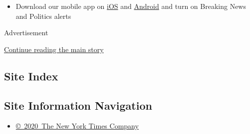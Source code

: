\begin{itemize}
  \begin{itemize}
  \tightlist
  \item
    Download our mobile app on
    \href{https://apps.apple.com/us/app/nytimes/id284862083?ls=1\&mat_click_id=5c79ae7455014fd1bd66b5610c05b8f2-20191112-16948\&referrer=mat_click_id\%3D5c79ae7455014fd1bd66b5610c05b8f2-20191112-16948\%26link_click_id\%3D722930677036718082}{iOS}
    and
    \href{http://a.localytics.com/android?id=com.nytimes.android\&referrer=utm_source\%3Dother_nyt_mobile_web\%26utm_medium\%3DWeb\%2520page\%26utm_term\%3DGeneral\%2520Mobile\%2520Page\%26utm_campaign\%3DNYT\%2520Mobile\%2520General\%2520Page}{Android}
    and turn on Breaking News and Politics alerts
  \end{itemize}
\end{itemize}

Advertisement

\protect\hyperlink{after-bottom}{Continue reading the main story}

\hypertarget{site-index}{%
\subsection{Site Index}\label{site-index}}

\hypertarget{site-information-navigation}{%
\subsection{Site Information
Navigation}\label{site-information-navigation}}

\begin{itemize}
\tightlist
\item
  \href{https://help.nytimes.com/hc/en-us/articles/115014792127-Copyright-notice}{©~2020~The
  New York Times Company}
\end{itemize}

